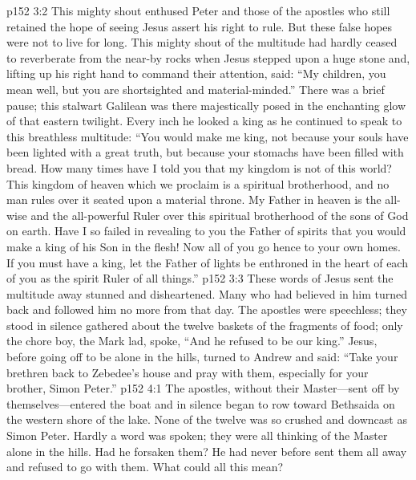 \vs p152 3:2 This mighty shout enthused Peter and those of the apostles who still retained the hope of seeing Jesus assert his right to rule. But these false hopes were not to live for long. This mighty shout of the multitude had hardly ceased to reverberate from the near\hyp{}by rocks when Jesus stepped upon a huge stone and, lifting up his right hand to command their attention, said: “My children, you mean well, but you are shortsighted and material\hyp{}minded.” There was a brief pause; this stalwart Galilean was there majestically posed in the enchanting glow of that eastern twilight. Every inch he looked a king as he continued to speak to this breathless multitude: \textcolor{ubdarkred}{“You would make me king, not because your souls have been lighted with a great truth, but because your stomachs have been filled with bread. How many times have I told you that my kingdom is not of this world? This kingdom of heaven which we proclaim is a spiritual brotherhood, and no man rules over it seated upon a material throne. My Father in heaven is the all\hyp{}wise and the all\hyp{}powerful Ruler over this spiritual brotherhood of the sons of God on earth. Have I so failed in revealing to you the Father of spirits that you would make a king of his Son in the flesh! Now all of you go hence to your own homes. If you must have a king, let the Father of lights be enthroned in the heart of each of you as the spirit Ruler of all things.”}
\pc \vs p152 3:3 These words of Jesus sent the multitude away stunned and disheartened. Many who had believed in him turned back and followed him no more from that day. The apostles were speechless; they stood in silence gathered about the twelve baskets of the fragments of food; only the chore boy, the Mark lad, spoke, “And he refused to be our king.” Jesus, before going off to be alone in the hills, turned to Andrew and said: \textcolor{ubdarkred}{“Take your brethren back to Zebedee’s house and pray with them, especially for your brother, Simon Peter.”}
\vs p152 4:1 The apostles, without their Master---sent off by themselves---entered the boat and in silence began to row toward Bethsaida on the western shore of the lake. None of the twelve was so crushed and downcast as Simon Peter. Hardly a word was spoken; they were all thinking of the Master alone in the hills. Had he forsaken them? He had never before sent them all away and refused to go with them. What could all this mean?
